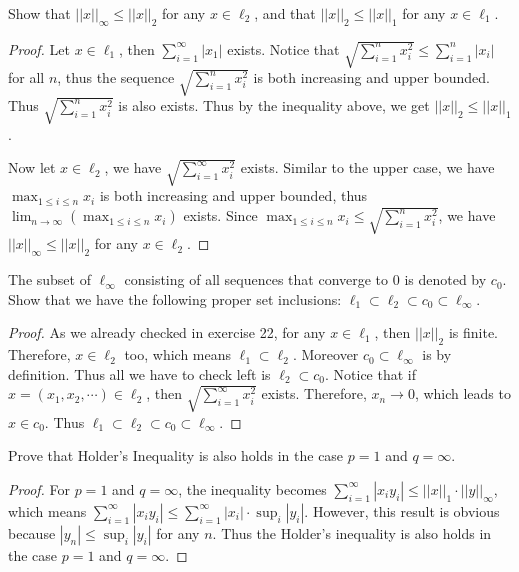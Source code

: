 \documentclass[12pt, a4paper]{article}
\theoremstyle{plain}
\begin{document}
\begin{exercise}{22}
Show that $||x||_\infty\leq ||x||_2$ for any $x\in \ell_2$, and that $||x||_2\leq ||x||_1$ for any $x\in\ell _1$.
\end{exercise}
	\begin{proof}
	Let $x\in\ell_1$, then $\sum_{i=1}^{\infty}{|x_1|}$ exists. Notice that $\sqrt{\sum_{i=1}^{n}{x_i^2}}\leq \sum_{i=1}^{n}{|x_i|}$ for all $n$, thus the sequence $\sqrt{\sum_{i=1}^{n}{x_i^2}}$ is both increasing and upper bounded. Thus $\sqrt{\sum_{i=1}^{n}{x_i^2}}$ is also exists. Thus by the inequality above, we get $||x||_2\leq ||x||_1$.
	
	Now let $x\in \ell_2$, we have $\sqrt{\sum_{i=1}^{\infty}{x_i^2}}$ exists. Similar to the upper case, we have $\max_{1\leq i\leq n}x_i$ is both increasing and upper bounded, thus $\lim_{n\rightarrow \infty}(\max_{1\leq i\leq n}x_i)$ exists. Since $\max_{1\leq i\leq n}x_i\leq \sqrt{\sum_{i=1}^{n}{x_i^2}}$, we have $||x||_\infty\leq ||x||_2$ for any $x\in\ell_2$.
	\end{proof}

\begin{exercise}{23}
The subset of $\ell_\infty$ consisting of all sequences that converge to $0$ is denoted by $c_0$. Show that we have the following proper set inclusions: $\ell_1\subset\ell_2\subset c_0\subset\ell_\infty$.
\end{exercise}
	\begin{proof}
	As we already checked in exercise 22, for any $x\in\ell_1$, then $||x||_2$ is finite. Therefore, $x\in\ell_2$ too, which means $\ell_1\subset\ell_2$. Moreover $c_0\subset\ell_\infty$ is by definition. Thus all we have to check left is $\ell_2\subset c_0$. Notice that if $x=(x_1,x_2,\cdots)\in\ell_2$, then $\sqrt{\sum_{i=1}^{\infty}{x_i^2}}$ exists. Therefore, $x_n\rightarrow 0$, which leads to $x\in c_0$. Thus $\ell_1\subset\ell_2\subset c_0\subset\ell_\infty$.
	\end{proof}

\begin{exercise}{24}
Prove that Holder's Inequality is also holds in the case $p=1$ and $q=\infty$.
\end{exercise}
	\begin{proof}
	For $p=1$ and $q=\infty$, the inequality becomes $\sum_{i=1}^{\infty}{|x_iy_i|}\leq ||x||_1\cdot ||y||_\infty$, which means $\sum_{i=1}^{\infty}{|x_iy_i|}\leq \sum_{i=1}^{\infty}{|x_i|\cdot\sup_i|y_i|}$. However, this result is obvious because $|y_n|\leq \sup_i|y_i|$ for any $n$. Thus the Holder's inequality is also holds in the case $p=1$ and $q=\infty$.
	\end{proof}
\end{document}
